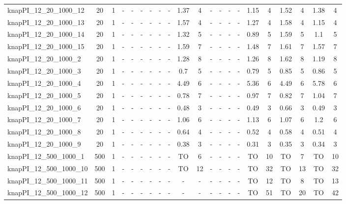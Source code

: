 \begin{sidewaystable}[!ht]
{\begin{tabular}{lcccccccccccccccccccc}
knapPI\_12\_20\_1000\_12 & 20 & 1 &  - &  - &  - &  - &  - &  - & 1.37 & 4 &  - &  - &  - &  - & 1.15 & 4 & 1.52 & 4 & 1.38 & 4 \\
knapPI\_12\_20\_1000\_13 & 20 & 1 &  - &  - &  - &  - &  - &  - & 1.57 & 4 &  - &  - &  - &  - & 1.27 & 4 & 1.58 & 4 & 1.15 & 4 \\
knapPI\_12\_20\_1000\_14 & 20 & 1 &  - &  - &  - &  - &  - &  - & 1.32 & 5 &  - &  - &  - &  - & 0.89 & 5 & 1.59 & 5 & 1.1 & 5 \\
knapPI\_12\_20\_1000\_15 & 20 & 1 &  - &  - &  - &  - &  - &  - & 1.59 & 7 &  - &  - &  - &  - & 1.48 & 7 & 1.61 & 7 & 1.57 & 7 \\
knapPI\_12\_20\_1000\_2 & 20 & 1 &  - &  - &  - &  - &  - &  - & 1.28 & 8 &  - &  - &  - &  - & 1.26 & 8 & 1.62 & 8 & 1.19 & 8 \\
knapPI\_12\_20\_1000\_3 & 20 & 1 &  - &  - &  - &  - &  - &  - & 0.7 & 5 &  - &  - &  - &  - & 0.79 & 5 & 0.85 & 5 & 0.86 & 5 \\
knapPI\_12\_20\_1000\_4 & 20 & 1 &  - &  - &  - &  - &  - &  - & 4.49 & 6 &  - &  - &  - &  - & 5.36 & 6 & 4.49 & 6 & 5.78 & 6 \\
knapPI\_12\_20\_1000\_5 & 20 & 1 &  - &  - &  - &  - &  - &  - & 0.78 & 7 &  - &  - &  - &  - & 0.97 & 7 & 0.82 & 7 & 1.04 & 7 \\
knapPI\_12\_20\_1000\_6 & 20 & 1 &  - &  - &  - &  - &  - &  - & 0.48 & 3 &  - &  - &  - &  - & 0.49 & 3 & 0.66 & 3 & 0.49 & 3 \\
knapPI\_12\_20\_1000\_7 & 20 & 1 &  - &  - &  - &  - &  - &  - & 1.06 & 6 &  - &  - &  - &  - & 1.13 & 6 & 1.07 & 6 & 1.2 & 6 \\
knapPI\_12\_20\_1000\_8 & 20 & 1 &  - &  - &  - &  - &  - &  - & 0.64 & 4 &  - &  - &  - &  - & 0.52 & 4 & 0.58 & 4 & 0.51 & 4 \\
knapPI\_12\_20\_1000\_9 & 20 & 1 &  - &  - &  - &  - &  - &  - & 0.38 & 3 &  - &  - &  - &  - & 0.31 & 3 & 0.35 & 3 & 0.34 & 3 \\
knapPI\_12\_500\_1000\_1 & 500 & 1 &  - &  - &  - &  - &  - &  - & TO & 6 &  - &  - &  - &  - & TO & 10 & TO & 7 & TO & 10 \\
knapPI\_12\_500\_1000\_10 & 500 & 1 &  - &  - &  - &  - &  - &  - & TO & 12 &  - &  - &  - &  - & TO & 32 & TO & 13 & TO & 32 \\
knapPI\_12\_500\_1000\_11 & 500 & 1 &  - &  - &  - &  - &  - &  - &  - &  - &  - &  - &  - &  - & TO & 12 & TO & 8 & TO & 13 \\
knapPI\_12\_500\_1000\_12 & 500 & 1 &  - &  - &  - &  - &  - &  - &  - &  - &  - &  - &  - &  - & TO & 51 & TO & 20 & TO & 42 \\

\end{tabular}}
\end{sidewaystable}
